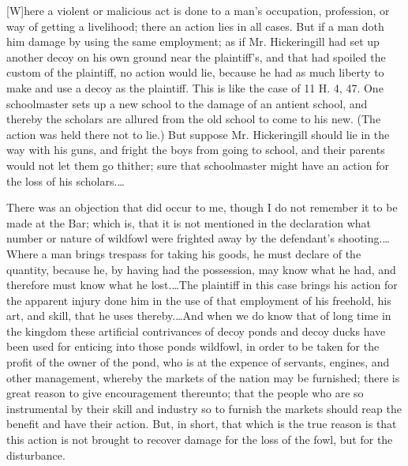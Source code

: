 [W]here a violent or malicious act is done to a man's occupation, profession, or
way of getting a livelihood; there an action lies in all cases. But if a man
doth him damage by using the same employment; as if Mr. Hickeringill had set up
another decoy on his own ground near the plaintiff's, and that had spoiled the
custom of the plaintiff, no action would lie, because he had as much liberty to
make and use a decoy as the plaintiff. This is like the case of 11 H. 4, 47. One
schoolmaster sets up a new school to the damage of an antient school, and
thereby the scholars are allured from the old school to come to his new. (The
action was held there not to lie.) But suppose Mr. Hickeringill should lie in
the way with his guns, and fright the boys from going to school, and their
parents would not let them go thither; sure that schoolmaster might have an
action for the loss of his scholars.\ldots

There was an objection that did occur to me, though I do not remember it to be
made at the Bar; which is, that it is not mentioned in the declaration what
number or nature of wildfowl were frighted away by the defendant's
shooting.\ldots Where a man brings trespass for taking his goods, he must
declare of the quantity, because he, by having had the possession, may know what
he had, and therefore must know what he lost.\ldots The plaintiff in this case
brings his action for the apparent injury done him in the use of that employment
of his freehold, his art, and skill, that he uses thereby.\ldots And when we do
know that of long time in the kingdom these artificial contrivances of decoy
ponds and decoy ducks have been used for enticing into those ponds wildfowl, in
order to be taken for the profit of the owner of the pond, who is at the expence
of servants, engines, and other management, whereby the markets of the nation
may be furnished; there is great reason to give encouragement thereunto; that
the people who are so instrumental by their skill and industry so to furnish the
markets should reap the benefit and have their action. But, in short, that which
is the true reason is that this action is not brought to recover damage for the
loss of the fowl, but for the disturbance. 


